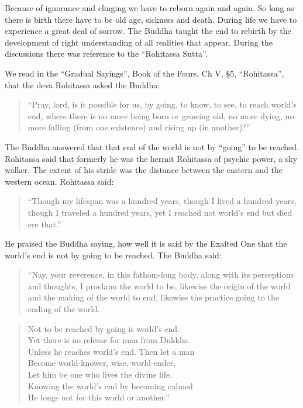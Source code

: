 Because of ignorance and clinging we have to reborn again and again. So
long as there is birth there have to be old age, sickness and death.
During life we have to experience a great deal of sorrow. The Buddha
taught the end to rebirth by the development of right understanding of
all realities that appear. During the discussions there was reference to
the ``Rohitassa Sutta''.

We read in the ``Gradual Sayings'', Book of the Fours, Ch V, §5,
``Rohitassa'', that the deva Rohitassa asked the Buddha:

\begin{quote}
``Pray, lord, is it possible for us, by going, to know, to see, to reach
world's end, where there is no more being born or growing old, no more
dying, no more falling (from one existence) and rising up (in
another)?''
\end{quote}

The Buddha answered that that end of the world is not by ``going'' to be
reached. Rohitassa said that formerly he was the hermit Rohitassa of
psychic power, a sky walker. The extent of his stride was the distance
between the eastern and the western ocean. Rohitassa said:

\begin{quote}
``Though my lifespan was a hundred years, though I lived a hundred
years, though I traveled a hundred years, yet I reached not world's end
but died ere that.''
\end{quote}

He praised the Buddha saying, how well it is said by the Exalted One
that the world's end is not by going to be reached. The Buddha said:

\begin{quote}
``Nay, your reverence, in this fathom-long body, along with its
perceptions and thoughts, I proclaim the world to be, likewise the
origin of the world and the making of the world to end, likewise the
practice going to the ending of the world.
\end{quote}

\begin{verse}
Not to be reached by going is world's end.\\
Yet there is no release for man from Dukkha\\
Unless he reaches world's end. Then let a man\\
Become world-knower, wise, world-ender,\\
Let him be one who lives the divine life.\\
Knowing the world's end by becoming calmed\\
He longs not for this world or another.''\\
\end{verse}

